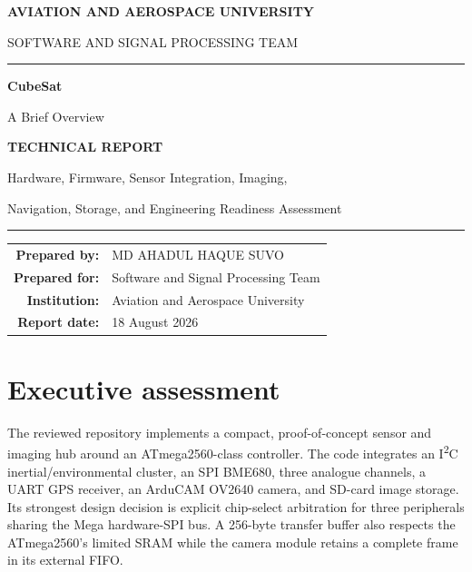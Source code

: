 \documentclass[11pt,a4paper]{article}
\begin{document}
\begin{titlepage}
\thispagestyle{empty}
\color{black}
\begin{center}
\vspace*{16mm}
{\Large\bfseries AVIATION AND AEROSPACE UNIVERSITY\par}
\vspace{5mm}
{\large SOFTWARE AND SIGNAL PROCESSING TEAM\par}

\vspace{18mm}
\rule{0.78\textwidth}{0.7pt}\par

\vspace{35mm}
{\Huge\bfseries CubeSat\par}
\vspace{7mm}
{\LARGE A Brief Overview\par}

\vspace{15mm}
{\large\bfseries TECHNICAL REPORT\par}
\vspace{6mm}
{\normalsize Hardware, Firmware, Sensor Integration, Imaging,\par
Navigation, Storage, and Engineering Readiness Assessment\par}

\vfill
\rule{0.55\textwidth}{0.5pt}\par
\vspace{9mm}
\begin{tabular}{@{}rl@{}}
\textbf{Prepared by:} & MD AHADUL HAQUE SUVO\\[2mm]
\textbf{Prepared for:} & Software and Signal Processing Team\\[2mm]
\textbf{Institution:} & Aviation and Aerospace University\\[2mm]
\textbf{Report date:} & 18 August 2026
\end{tabular}
\vspace{20mm}
\end{center}
\end{titlepage}

\tableofcontents
\clearpage
{}

\section{Executive assessment}

The reviewed repository implements a compact, proof-of-concept sensor and imaging hub around an ATmega2560-class controller. The code integrates an I\textsuperscript{2}C inertial/environmental cluster, an SPI BME680, three analogue channels, a UART GPS receiver, an ArduCAM OV2640 camera, and SD-card image storage. Its strongest design decision is explicit chip-select arbitration for three peripherals sharing the Mega hardware-SPI bus. A 256-byte transfer buffer also respects the ATmega2560's limited SRAM while the camera module retains a complete frame in its external FIFO.
\end{document}
